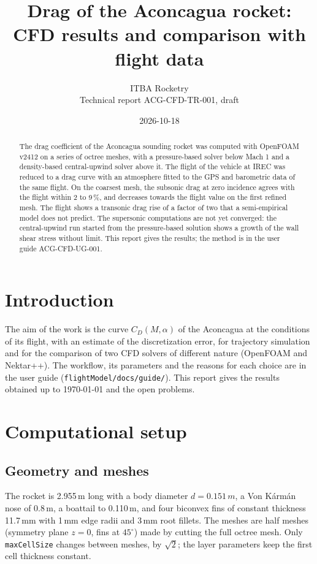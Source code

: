 \documentclass[11pt,a4paper]{article}
\title{\sffamily\bfseries\color{brand} Drag of the Aconcagua rocket:\\ CFD results and comparison with flight data}
\author{ITBA Rocketry \\ \small Technical report ACG-CFD-TR-001, draft}
\date{2026-10-18}
\newcommand{\file}{\nolinkurl}
\newcommand{\unit}[2]{#1\,#2}
\begin{document}
\maketitle

\begin{abstract}
The drag coefficient of the Aconcagua sounding rocket was computed with OpenFOAM v2412
on a series of octree meshes, with a pressure-based solver below Mach 1 and a
density-based central-upwind solver above it. The flight of the vehicle at IREC was
reduced to a drag curve with an atmosphere fitted to the GPS and barometric data of the
same flight. On the coarsest mesh, the subsonic drag at zero incidence agrees with the
flight within 2 to 9\,\%, and decreases towards the flight value on the first refined
mesh. The flight shows a transonic drag rise of a factor of two that a semi-empirical
model does not predict. The supersonic computations are not yet converged: the
central-upwind run started from the pressure-based solution shows a growth of the wall
shear stress without limit. This report gives the results; the method is in the user
guide ACG-CFD-UG-001.
\end{abstract}

\section{Introduction}

The aim of the work is the curve $C_D(M, \alpha)$ of the Aconcagua at the conditions of
its flight, with an estimate of the discretization error, for trajectory simulation and
for the comparison of two CFD solvers of different nature (OpenFOAM and Nektar++). The
workflow, its parameters and the reasons for each choice are in the user guide
(\file{flightModel/docs/guide/}). This report gives the results obtained up to
\today{} and the open problems.

\section{Computational setup}

\subsection{Geometry and meshes}

The rocket is \unit{2.955}{m} long with a body diameter $d = \unit{0.151}{m}$, a Von
Kármán nose of \unit{0.8}{m}, a boattail to \unit{0.110}{m}, and four biconvex fins of
constant thickness \unit{11.7}{mm} with \unit{1}{mm} edge radii and \unit{3}{mm} root
fillets. The meshes are half meshes (symmetry plane $z = 0$, fins at $45^\circ$) made by
cutting the full octree mesh. Only \texttt{maxCellSize} changes between meshes, by
$\sqrt{2}$; the layer parameters keep the first cell thickness constant.
\end{document}
